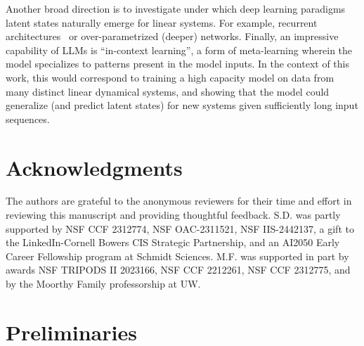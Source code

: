 \documentclass[11pt]{article}
\renewcommand{\cite}{\citep}
\newcommand{\<}{\langle}
\renewcommand{\>}{\rangle}
\numberwithin{equation}{section}
\begin{document}
Another broad direction is to investigate under which deep learning paradigms latent states naturally emerge for linear systems.
For example, recurrent architectures~\cite{hardt2018gradient} or over-parametrized (deeper) networks.
%
Finally, an impressive capability of LLMs is ``in-context learning'', a form of meta-learning wherein the model specializes to patterns present in the model inputs.
In the context of this work, this would correspond to training a high capacity model on data from many distinct linear dynamical systems, 
and showing that the model could generalize (and predict latent states) for new systems given sufficiently long input sequences.
\section*{Acknowledgments}

The authors are grateful to the anonymous reviewers for their time and effort in reviewing this manuscript and providing thoughtful feedback.
S.D. was partly supported by NSF CCF 2312774, NSF OAC-2311521, NSF IIS-2442137, a gift to the LinkedIn-Cornell Bowers CIS Strategic Partnership, and an AI2050 Early Career Fellowship program at Schmidt Sciences. 
M.F. was supported in part by awards NSF TRIPODS II
2023166, NSF CCF 2212261, NSF CCF 2312775, and by the Moorthy Family professorship at UW.


\newpage




\newpage
\appendix
%
\section{Preliminaries}\label{app:prelim}
\end{document}
